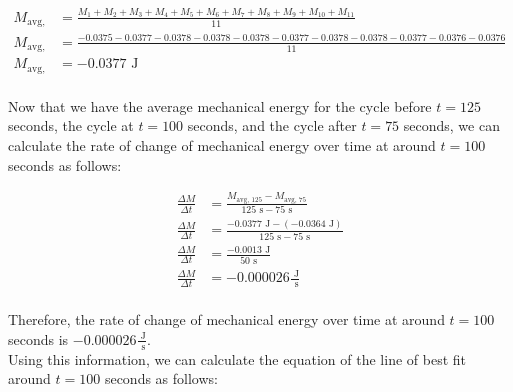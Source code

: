 \documentclass{article}
\begin{document}
            \begin{equation}
                \begin{aligned}
                    M_{\text{avg, 125}} &= \frac{M_1 + M_2 + M_3 + M_4 + M_5 + M_6 + M_7 + M_8 + M_9 + M_{10} + M_{11}}{11} \\
                    M_{\text{avg, 125}} &= \frac{-0.0375 -0.0377 -0.0378 -0.0378 -0.0378 -0.0377 -0.0378 -0.0378 -0.0377 -0.0376 -0.0376}{11} \\
                    M_{\text{avg, 125}} &= -0.0377 \text{ J} \\
                \end{aligned}\label{eq:average-mechanical-energy-cycle-at-125-seconds}
            \end{equation}
            
            Now that we have the average mechanical energy for the cycle before $t=125$ seconds, the cycle at $t=100$ seconds, and the cycle after $t=75$ seconds, we can calculate the rate of change of mechanical energy over time at around $t=100$ seconds as follows:
            
            
            \begin{equation}
                \begin{aligned}
                    \frac{\Delta M}{\Delta t} &= \frac{M_{\text{avg, 125}} - M_{\text{avg, 75}}} {125 \text{ s} - 75 \text{ s}} \\
                    \frac{\Delta M}{\Delta t} &= \frac{-0.0377 \text{ J} - (-0.0364 \text{ J})} {125 \text{ s} - 75 \text{ s}} \\
                    \frac{\Delta M}{\Delta t} &= \frac{-0.0013 \text{ J}} {50 \text{ s}} \\
                    \frac{\Delta M}{\Delta t} &= -0.000026 \frac{\text{ J}}{\text{ s}} \\
                \end{aligned}\label{eq:rate-of-change-of-mechanical-energy-over-time-around-100-seconds}
            \end{equation}
            
            
            Therefore, the rate of change of mechanical energy over time at around $t=100$ seconds is $-0.000026 \frac{\text{ J}}{\text{ s}}$. \\
            
            Using this information, we can calculate the equation of the line of best fit around $t=100$ seconds as follows:
            
\end{document}
